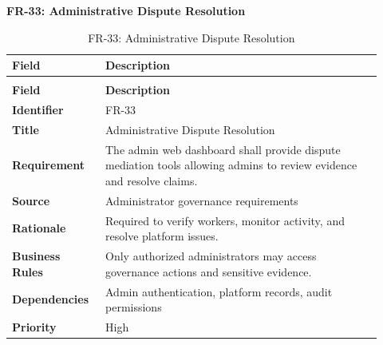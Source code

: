 \documentclass[12pt,a4paper]{article}
\begin{document}
\noindent\textbf{FR-33: Administrative Dispute Resolution}\par
\vspace{4pt}
\begingroup\small\setlength{\tabcolsep}{4pt}\renewcommand{\arraystretch}{1.15}
\begin{longtable}{|>{\raggedright\arraybackslash}p{0.22\linewidth}|>{\raggedright\arraybackslash}p{0.70\linewidth}|}
\caption{FR-33: Administrative Dispute Resolution}\label{tab:fr-33}\\
\hline
\textbf{Field} & \textbf{Description} \\ \hline
\endfirsthead
\multicolumn{2}{c}{Table \thetable\ Administrative Dispute Resolution (continued)}\\
\hline
\textbf{Field} & \textbf{Description} \\ \hline
\endhead
\textbf{Identifier} & FR-33 \\ \hline
\textbf{Title} & Administrative Dispute Resolution \\ \hline
\textbf{Requirement} & The admin web dashboard shall provide dispute mediation tools allowing admins to review evidence and resolve claims. \\ \hline
\textbf{Source} & Administrator governance requirements \\ \hline
\textbf{Rationale} & Required to verify workers, monitor activity, and resolve platform issues. \\ \hline
\textbf{Business Rules} & Only authorized administrators may access governance actions and sensitive evidence. \\ \hline
\textbf{Dependencies} & Admin authentication, platform records, audit permissions \\ \hline
\textbf{Priority} & High \\ \hline
\end{longtable}
\endgroup
\end{document}
